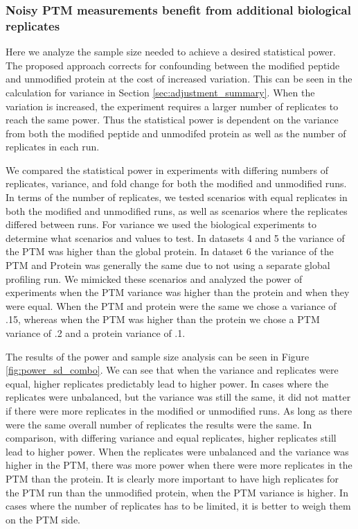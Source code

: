 \documentclass[mcp]{article}
\numberwithin{table}{section}
\begin{document}
\subsubsection*{Noisy PTM measurements benefit from additional biological replicates}

Here we analyze the sample size needed to achieve a desired statistical power. The proposed approach corrects for confounding between the modified peptide and unmodified protein at the cost of increased variation. This can be seen in the calculation for variance in Section \ref{sec:adjustment_summary}. When the variation is increased, the experiment requires a larger number of replicates to reach the same power. Thus the statistical power is dependent on the variance from both the modified peptide and unmodifed protein as well as the number of replicates in each run.

We compared the statistical power in experiments with differing numbers of replicates, variance, and fold change for both the modified and unmodified runs. In terms of the number of replicates, we tested scenarios with equal replicates in both the modified and unmodified runs, as well as scenarios where the replicates differed between runs. For variance we used the biological experiments to determine what scenarios and values to test. In datasets 4 and 5 the variance of the PTM was higher than the global protein. In dataset 6 the variance of the PTM and Protein was generally the same due to not using a separate global profiling run. We mimicked these scenarios and analyzed the power of experiments when the PTM variance was higher than the protein and when they were equal. When the PTM and protein were the same we chose a variance of .15, whereas when the PTM was higher than the protein we chose a PTM variance of .2 and a protein variance of .1.

The results of the power and sample size analysis can be seen in Figure \ref{fig:power_sd_combo}. We can see that when the variance and replicates were equal, higher replicates predictably lead to higher power. In cases where the replicates were unbalanced, but the variance was still the same, it did not matter if there were more replicates in the modified or unmodified runs. As long as there were the same overall number of replicates the results were the same. In comparison, with differing variance and equal replicates, higher replicates still lead to higher power. When the replicates were unbalanced and the variance was higher in the PTM, there was more power when there were more replicates in the PTM than the protein. It is clearly more important to have high replicates for the PTM run than the unmodified protein, when the PTM variance is higher. In cases where the number of replicates has to be limited, it is better to weigh them on the PTM side.
\end{document}
